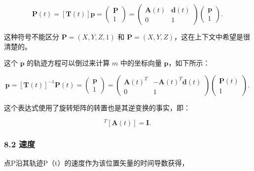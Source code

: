 \begin{equation}
\mathbf{P}(t) = [\mathbf{T}(t)] \mathbf{p} = 
\begin{pmatrix}
\mathbf{P} \\
1 
\end{pmatrix} = 
\begin{pmatrix}
\mathbf{A}(t) & \mathbf{d}(t) \\
0 & 1 
\end{pmatrix}
\begin{pmatrix}
\mathbf{p} \\
1 
\end{pmatrix}.~
\end{equation}

这种符号不能区分 $\mathbf{P} = (X, Y, Z, 1)$ 和 $\mathbf{P} = (X, Y, Z)$，这在上下文中希望是很清楚的。

这个 $\mathbf{p}$ 的轨迹方程可以倒过来计算 $m$ 中的坐标向量 $\mathbf{p}$，如下所示：

\begin{equation}
\mathbf{p} = [\mathbf{T}(t)]^{-1} \mathbf{P}(t) = 
\begin{pmatrix}
\mathbf{p} \\
1 
\end{pmatrix} = 
\begin{pmatrix}
\mathbf{A}(t)^T & -\mathbf{A}(t)^T \mathbf{d}(t) \\
0 & 1 
\end{pmatrix}
\begin{pmatrix}
\mathbf{P}(t) \\
1 
\end{pmatrix}.~
\end{equation}

这个表达式使用了旋转矩阵的转置也是其逆变换的事实，即：

\begin{equation}
[\mathbf{A}(t)]^T [\mathbf{A}(t)] = \mathbf{I}.~
\end{equation}

\subsubsection{8.2 速度}

点P沿其轨迹P（t）的速度作为该位置矢量的时间导数获得，

